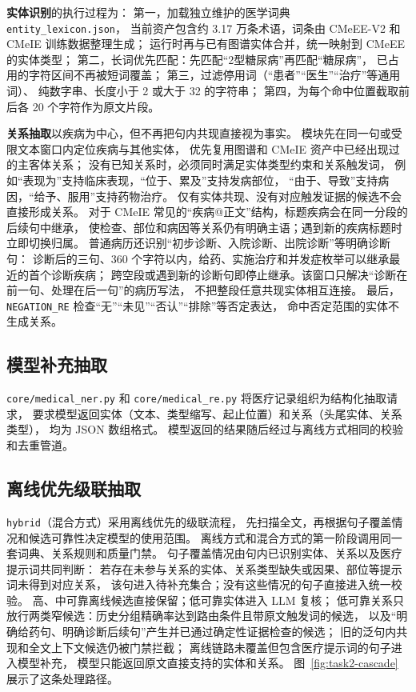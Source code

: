 \textbf{实体识别}的执行过程为：
第一，加载独立维护的医学词典 \texttt{entity\_lexicon.json}，
当前资产包含约 3.17 万条术语，词条由 CMeEE-V2 和 CMeIE 训练数据整理生成；
运行时再与已有图谱实体合并，统一映射到 CMeEE 的实体类型；
第二，长词优先匹配：先匹配“2型糖尿病”再匹配“糖尿病”，
已占用的字符区间不再被短词覆盖；
第三，过滤停用词（“患者”“医生”“治疗”等通用词）、
纯数字串、长度小于 2 或大于 32 的字符串；
第四，为每个命中位置截取前后各 20 个字符作为原文片段。

\textbf{关系抽取}以疾病为中心，但不再把句内共现直接视为事实。
模块先在同一句或受限文本窗口内定位疾病与其他实体，
优先复用图谱和 CMeIE 资产中已经出现过的主客体关系；
没有已知关系时，必须同时满足实体类型约束和关系触发词，
例如“表现为”支持临床表现，“位于、累及”支持发病部位，
“由于、导致”支持病因，“给予、服用”支持药物治疗。
仅有实体共现、没有对应触发证据的候选不会直接形成关系。
对于 CMeIE 常见的“疾病@正文”结构，标题疾病会在同一分段的后续句中继承，
使检查、部位和病因等关系仍有明确主语；遇到新的疾病标题时立即切换归属。
普通病历还识别“初步诊断、入院诊断、出院诊断”等明确诊断句：
诊断后的三句、360 个字符以内，给药、实施治疗和并发症枚举可以继承最近的首个诊断疾病；
跨空段或遇到新的诊断句即停止继承。该窗口只解决“诊断在前一句、处理在后一句”的病历写法，
不把整段任意共现实体相互连接。
最后，\texttt{NEGATION\_RE} 检查“无”“未见”“否认”“排除”等否定表达，
命中否定范围的实体不生成关系。

\subsection{模型补充抽取}

\texttt{core/medical\_ner.py} 和 \texttt{core/medical\_re.py}
将医疗记录组织为结构化抽取请求，
要求模型返回实体（文本、类型缩写、起止位置）和关系（头尾实体、关系类型），
均为 JSON 数组格式。
模型返回的结果随后经过与离线方式相同的校验和去重管道。

\subsection{离线优先级联抽取}

\texttt{hybrid}（混合方式）采用离线优先的级联流程，
先扫描全文，再根据句子覆盖情况和候选可靠性决定模型的使用范围。
离线方式和混合方式的第一阶段调用同一套词典、关系规则和质量门禁。
句子覆盖情况由句内已识别实体、关系以及医疗提示词共同判断：
若存在未参与关系的实体、关系类型缺失或因果、部位等提示词未得到对应关系，
该句进入待补充集合；没有这些情况的句子直接进入统一校验。
高、中可靠离线候选直接保留；低可靠实体进入 LLM 复核；
低可靠关系只放行两类窄候选：历史分组精确率达到路由条件且带原文触发词的候选，
以及“明确给药句、明确诊断后续句”产生并已通过确定性证据检查的候选；
旧的泛句内共现和全文上下文候选仍被门禁拦截；
离线链路未覆盖但包含医疗提示词的句子进入模型补充，
模型只能返回原文直接支持的实体和关系。
图~\ref{fig:task2-cascade} 展示了这条处理路径。


